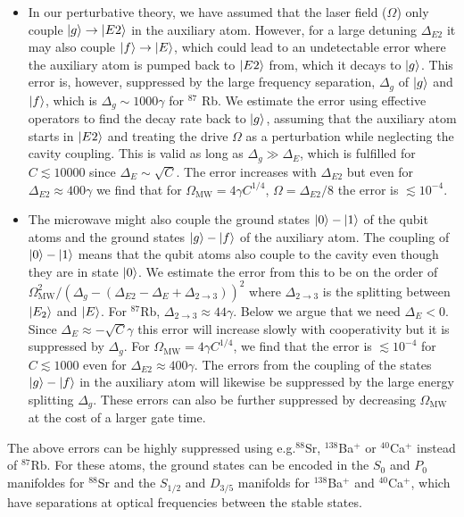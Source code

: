 \begin{itemize}
\item In our perturbative theory, we have assumed that the laser field ($\Omega$) only couple $| g \rangle\to| E2 \rangle$ in the auxiliary atom. However, for a large detuning $\Delta_{E2}$ it may also couple $| f \rangle\to| E \rangle$, which could lead to an undetectable error where the auxiliary atom is pumped back to $| E2 \rangle$ from, which it decays to $| g \rangle$. This error is, however, suppressed by the large frequency separation, $\Delta_{g}$ of $| g \rangle$ and $| f \rangle$, which is $\Delta_{g}\sim1000\gamma$ for ${}^{87}$ Rb. We estimate the error using effective operators to find the decay rate back to $| g \rangle$, assuming that the auxiliary atom starts in $| E2 \rangle$ and treating the drive $\Omega$ as a perturbation while neglecting the cavity coupling. This is valid as long as $\Delta_{g}\gg\Delta_{E}$, which is fulfilled for $C\lesssim10000$ since $\Delta_{E}\sim\sqrt{C}$. The error increases with $\Delta_{E2}$ but even for $\Delta_{E2}\approx400\gamma$ we find that for $\Omega_{\text{MW}}=4\gamma C^{1/4}$, $\Omega=\Delta_{E2}/8$ the error is $\lesssim10^{-4}$.     

\item The microwave might also couple the ground states $| 0 \rangle-| 1 \rangle$ of the
qubit atoms and the ground states $| g \rangle-| f \rangle$ of the auxiliary atom. The
coupling of $| 0 \rangle-| 1 \rangle$ means that the qubit atoms also couple to the
cavity even though they are in state $| 0 \rangle$. We estimate the error from this
to be on the order of
$\Omega_{\text{MW}}^{2}/(\Delta_{g}-(\Delta_{E2}-\Delta_{E}+\Delta_{2\to3}))^2$
where $\Delta_{2\to3}$ is the splitting between $| E_{2} \rangle$ and $| E \rangle$. For
${}^{87}$Rb, $\Delta_{2\to3}\approx44\gamma$. Below we argue that we need
$\Delta_{E}<0$. Since $\Delta_{E}\approx-\sqrt{C}\gamma$ this error will
increase slowly with cooperativity but it is suppressed by $\Delta_{g}$. For
$\Omega_{\text{MW}}=4\gamma C^{1/4}$, we find that the error is
$\lesssim10^{-4}$ for $C\lesssim1000$ even for $\Delta_{E2}\approx400\gamma$.
The errors from the coupling of the states $| g \rangle-| f \rangle$ in the auxiliary
atom will likewise be suppressed by the large energy splitting $\Delta_{g}$.
These errors can also be further suppressed by decreasing $\Omega_{\text{MW}}$
at the cost of a larger gate time.
\end{itemize}

The above errors can be highly suppressed using e.g.${}^{88}$Sr,
${}^{138}$Ba${}^{+}$ or ${}^{40}$Ca${}^{+}$ instead of ${}^{87}$Rb. For these
atoms, the ground states can be encoded in the $S_{0}$ and $P_{0}$ manifoldes
for ${}^{88}$Sr and the $S_{1/2}$ and $D_{3/5}$ manifolds for
${}^{138}$Ba${}^{+}$ and ${}^{40}$Ca${}^{+}$, which have separations at optical
frequencies between the stable states.


